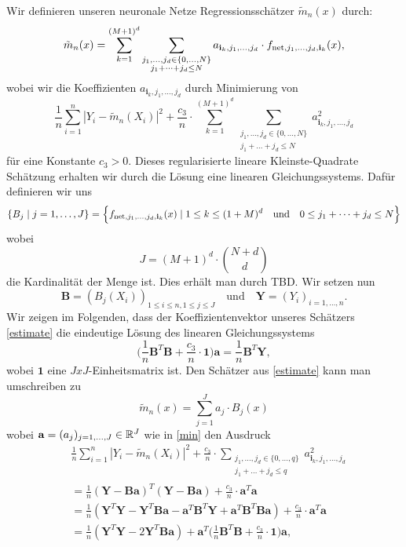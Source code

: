 Wir definieren unseren neuronale Netze Regressionsschätzer $\tilde{m}_n(x)$ durch$\colon$
\begin{equation}
\label{estimate}
\tilde{m}_n(x) = \sum_{k = 1}^{(M + 1)^d} \sum_{\substack{ j_1,\dots,j_d \in \{0,\dots,N\} \\j_1+\dots +j_d \leq N}} a_{\mathbf{i}_k,j_1,\dots,j_d} \cdot f_{\mathrm{net},j_1,\dots,j_d,\mathbf{i}_k}(x),
\end{equation}
wobei wir die Koeffizienten $a_{\mathbf{i}_k,j_1,\dots,j_d}$ durch Minimierung von 
\begin{equation}
\label{min} \frac{1}{n} \sum_{i = 1}^n|Y_i - \tilde{m}_n(X_i)|^2 + \frac{c_3}{n} \cdot \sum_{k = 1}^{(M + 1)^d} \sum_{\substack{ j_1,\dots,j_d \in \{0,\dots,N\} \\j_1+\dots +j_d \leq N}} a_{\mathbf{i}_k,j_1,\dots,j_d}^2
\end{equation}
für eine Konstante $c_3 > 0.$ Dieses regularisierte lineare Kleinste-Quadrate Schätzung erhalten wir durch die Lösung eine linearen Gleichungssystems. Dafür definieren wir uns 
\begin{align*} 
\{B_j \mid j = 1,\dots,J\} = \Bigl\{f_{\mathrm{net},j_1,\dots,j_d,\mathbf{i}_k}(x) \mid 1\leq k \leq (1 + M)^d \quad \text{und} \quad 0 \leq j_1 + \cdots + j_d \leq N \Bigr\}
\end{align*}
wobei
$$ J = (M + 1)^d \cdot \binom{N + d}{d}$$ die Kardinalität der Menge ist.
Dies erhält man durch TBD.
Wir setzen nun 
$$ \mathbf{B} = (B_j(X_i))_{1\leq i \leq n,1\leq j \leq J} \quad \text{und} \quad \mathbf{Y} = (Y_i)_{i = 1,\dots,n}.$$
Wir zeigen im Folgenden, dass der Koeffizientenvektor unseres Schätzers \ref{estimate} die eindeutige Lösung des linearen Gleichungssystems 
\begin{equation}
\label{les}
\bigg(\frac{1}{n}\mathbf{B}^T\mathbf{B} + \frac{c_3}{n} \cdot \mathbf{1} \bigg) \mathbf{a} = \frac{1}{n} \mathbf{B}^T\mathbf{Y},
\end{equation}
wobei $\mathbf{1}$ eine $JxJ$-Einheitsmatrix ist.
Den Schätzer aus \ref{estimate} kann man umschreiben zu 
$$ \tilde{m}_n(x) = \sum_{j = 1}^J a_j \cdot B_j(x)$$
wobei $\mathbf{a} = (a_j)_{j = 1,\dots,J} \in \mathbb{R}^J$ wie in \ref{min} den Ausdruck
\begin{equation}
\begin{split}
& \frac{1}{n} \sum_{i = 1}^n|Y_i - \tilde{m}_n(X_i)|^2 + \frac{c_3}{n} \cdot \sum_{\substack{ j_1,\dots,j_d \in \{0,\dots,q\} \\j_1+\dots +j_d \leq q}} a_{\mathbf{i}_k,j_1,\dots,j_d}^2 \\
& = \frac{1}{n}(\mathbf{Y} - \mathbf{B}\mathbf{a})^T(\mathbf{Y} - \mathbf{B}\mathbf{a}) + \frac{c_3}{n} \cdot \mathbf{a}^T\mathbf{a} \\
& = \frac{1}{n}(\mathbf{Y}^T\mathbf{Y} - \mathbf{Y}^T\mathbf{B}\mathbf{a} - \mathbf{a}^T\mathbf{B}^T\mathbf{Y} + \mathbf{a}^T\mathbf{B}^T\mathbf{B}\mathbf{a}) + \frac{c_3}{n} \cdot \mathbf{a}^T\mathbf{a} \\
& = \frac{1}{n}(\mathbf{Y}^T\mathbf{Y} - 2\mathbf{Y}^T\mathbf{B}\mathbf{a}) + \mathbf{a}^T\bigg(\frac{1}{n} \mathbf{B}^T\mathbf{B} + \frac{c_3}{n} \cdot \mathbf{1}\bigg) \mathbf{a}, 
\end{split}
\end{equation} 
